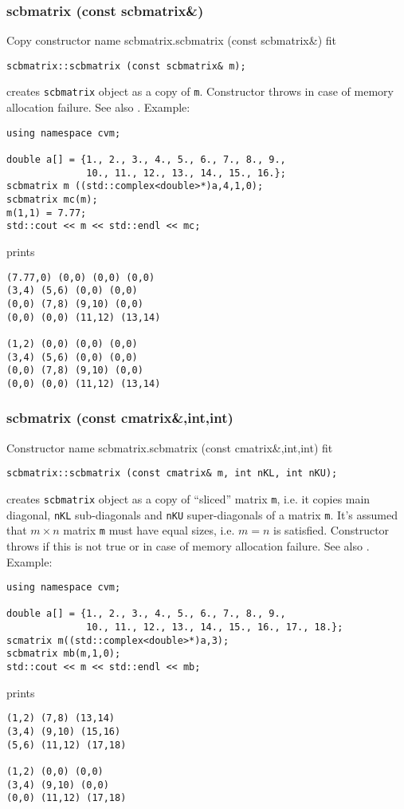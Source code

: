 \subsubsection{scbmatrix (const scbmatrix\&)}
Copy constructor%
\pdfdest name {scbmatrix.scbmatrix (const scbmatrix&)} fit
\begin{verbatim}
scbmatrix::scbmatrix (const scbmatrix& m);
\end{verbatim}
creates  \verb"scbmatrix" object as a copy of \verb"m".
Constructor throws  
in case of memory allocation failure.
See also .
Example:
\begin{Verbatim}
using namespace cvm;

double a[] = {1., 2., 3., 4., 5., 6., 7., 8., 9.,
              10., 11., 12., 13., 14., 15., 16.};
scbmatrix m ((std::complex<double>*)a,4,1,0);
scbmatrix mc(m);
m(1,1) = 7.77;
std::cout << m << std::endl << mc;
\end{Verbatim}
prints
\begin{Verbatim}
(7.77,0) (0,0) (0,0) (0,0)
(3,4) (5,6) (0,0) (0,0)
(0,0) (7,8) (9,10) (0,0)
(0,0) (0,0) (11,12) (13,14)

(1,2) (0,0) (0,0) (0,0)
(3,4) (5,6) (0,0) (0,0)
(0,0) (7,8) (9,10) (0,0)
(0,0) (0,0) (11,12) (13,14)
\end{Verbatim}
\newpage




\subsubsection{scbmatrix (const cmatrix\&,int,int)}
Constructor%
\pdfdest name {scbmatrix.scbmatrix (const cmatrix&,int,int)} fit
\begin{verbatim}
scbmatrix::scbmatrix (const cmatrix& m, int nKL, int nKU);
\end{verbatim}
creates  \verb"scbmatrix" object as a copy of ``sliced'' 
matrix \verb"m", i.e. it copies main diagonal, \verb"nKL" 
sub-diagonals and \verb"nKU" super-diagonals of a matrix \verb"m".
It's assumed that $m\times n$ matrix \verb"m" must have equal
sizes, i.e. $m = n$ is satisfied.
Constructor throws  
if this is not true or in case of memory allocation failure.
See also .
Example:
\begin{Verbatim}
using namespace cvm;

double a[] = {1., 2., 3., 4., 5., 6., 7., 8., 9.,
              10., 11., 12., 13., 14., 15., 16., 17., 18.};
scmatrix m((std::complex<double>*)a,3);
scbmatrix mb(m,1,0);
std::cout << m << std::endl << mb;
\end{Verbatim}
prints
\begin{Verbatim}
(1,2) (7,8) (13,14)
(3,4) (9,10) (15,16)
(5,6) (11,12) (17,18)

(1,2) (0,0) (0,0)
(3,4) (9,10) (0,0)
(0,0) (11,12) (17,18)
\end{Verbatim}
\newpage




